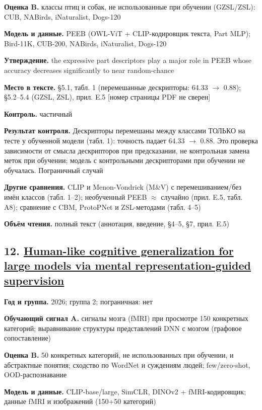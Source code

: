 \textbf{Оценка B.} классы птиц и собак, не использованные при обучении (GZSL/ZSL): CUB, NABirds, iNaturalist, Dogs-120

\textbf{Модель и данные.} PEEB (OWL-ViT + CLIP-кодировщик текста, Part MLP); Bird-11K, CUB-200, NABirds, iNaturalist, Dogs-120

\textbf{Утверждение.} the expressive part descriptors play a major role in PEEB whose accuracy decreases significantly to near random-chance

\textbf{Место в тексте.} §5.1, табл. 1 (перемешанные дескрипторы: 64.33 $\rightarrow$ 0.88); §5.2–5.4 (GZSL, ZSL), прил. E.5 [номер страницы PDF не сверен]

\textbf{Контроль.} частичный

\textbf{Результат контроля.} Дескрипторы перемешаны между классами ТОЛЬКО на тесте у обученной модели (табл. 1): точность падает 64.33 $\rightarrow$ 0.88. Это проверка зависимости от смысла дескрипторов при предсказании, не контрольная замена меток при обучении; модель с контрольными дескрипторами при обучении не обучалась. Пограничный случай

\textbf{Другие сравнения.} CLIP и Menon-Vondrick (M\&V) с перемешиванием/без имён классов (табл. 1–2); необученный PEEB $\approx$ случайно (прил. E.5, табл. A8); сравнение с CBM, ProtoPNet и ZSL-методами (табл. 4–5)

\textbf{Объём чтения.} полный текст (аннотация, введение, §4–5, §7, прил. E.5)


\subsection*{12. \href{https://doi.org/10.1038/s41467-026-71267-5}{Human-like cognitive generalization for large models via mental representation-guided supervision}}

\textbf{Год и группа.} 2026; группа 2; пограничная: нет

\textbf{Обучающий сигнал A.} сигналы мозга (fMRI) при просмотре 150 конкретных категорий; выравнивание структуры представлений DNN с мозгом (графовое сопоставление)

\textbf{Оценка B.} 50 конкретных категорий, не использованных при обучении, и абстрактные понятия; сходство по WordNet и суждениям людей; few/zero-shot, OOD-распознавание

\textbf{Модель и данные.} CLIP-base/large, SimCLR, DINOv2 + fMRI-кодировщик; данные fMRI и изображений (150+50 категорий)

